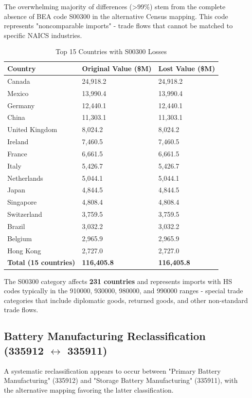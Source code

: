 \documentclass[11pt]{article}
\begin{document}
The overwhelming majority of differences (>99\%) stem from the complete absence of BEA code S00300 in the alternative Census mapping. This code represents "noncomparable imports" - trade flows that cannot be matched to specific NAICS industries.

\begin{table}[H]
\centering
\caption{Top 15 Countries with S00300 Losses}
\begin{tabular}{lR{2.5cm}R{2.5cm}}
\toprule
\textbf{Country} & \textbf{Original Value (\$M)} & \textbf{Lost Value (\$M)} \\
\midrule
Canada & 24,918.2 & 24,918.2 \\
Mexico & 13,990.4 & 13,990.4 \\
Germany & 12,440.1 & 12,440.1 \\
China & 11,303.1 & 11,303.1 \\
United Kingdom & 8,024.2 & 8,024.2 \\
Ireland & 7,460.5 & 7,460.5 \\
France & 6,661.5 & 6,661.5 \\
Italy & 5,426.7 & 5,426.7 \\
Netherlands & 5,044.1 & 5,044.1 \\
Japan & 4,844.5 & 4,844.5 \\
Singapore & 4,808.4 & 4,808.4 \\
Switzerland & 3,759.5 & 3,759.5 \\
Brazil & 3,032.2 & 3,032.2 \\
Belgium & 2,965.9 & 2,965.9 \\
Hong Kong & 2,727.0 & 2,727.0 \\
\midrule
\textbf{Total (15 countries)} & \textbf{116,405.8} & \textbf{116,405.8} \\
\bottomrule
\end{tabular}
\label{tab:s00300_losses}
\end{table}

The S00300 category affects \textbf{231 countries} and represents imports with HS codes typically in the 910000, 930000, 980000, and 990000 ranges - special trade categories that include diplomatic goods, returned goods, and other non-standard trade flows.

\subsection{Battery Manufacturing Reclassification (335912 $\leftrightarrow$ 335911)}

A systematic reclassification appears to occur between "Primary Battery Manufacturing" (335912) and "Storage Battery Manufacturing" (335911), with the alternative mapping favoring the latter classification.
\end{document}
